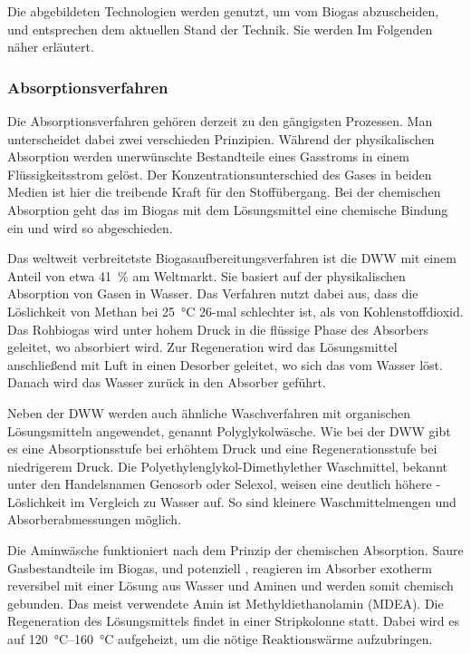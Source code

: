 

Die abgebildeten Technologien werden genutzt, um  vom Biogas abzuscheiden, und entsprechen dem aktuellen Stand der Technik. Sie werden Im Folgenden näher erläutert. 


\subsubsection{Absorptionsverfahren}\label{chap:absorp}

Die Absorptionsverfahren gehören derzeit zu den gängigsten Prozessen. Man unterscheidet dabei zwei verschieden Prinzipien. Während der physikalischen Absorption werden unerwünschte Bestandteile eines Gasstroms in einem Flüssigkeitsstrom gelöst. Der Konzentrationsunterschied des Gases in beiden Medien ist hier die treibende Kraft für den Stoffübergang. Bei der chemischen Absorption geht das  im Biogas mit dem Lösungsmittel eine chemische Bindung ein und wird so abgeschieden. \parencite{Rasi09} \smallskip

Das weltweit verbreitetste Biogasaufbereitungsverfahren ist die \gls{DWW} mit einem Anteil von etwa \SI{41}{\percent} am Weltmarkt. Sie basiert auf der physikalischen Absorption von Gasen in Wasser. Das Verfahren nutzt dabei aus, dass die Löslichkeit von Methan bei \SI{25}{\degreeCelsius} \SI{26}{\relax}-mal schlechter ist, als von Kohlenstoffdioxid. Das Rohbiogas wird unter hohem Druck in die flüssige Phase des Absorbers geleitet, wo  absorbiert wird. Zur Regeneration wird das Lösungsmittel anschließend mit Luft in einen Desorber geleitet, wo sich das  vom Wasser löst. Danach wird das Wasser zurück in den Absorber geführt.  \parencite{KGKK2019} \parencite{BHPT13} \smallskip

Neben der \gls{DWW} werden auch ähnliche Waschverfahren mit organischen Lösungsmitteln angewendet, genannt Polyglykolwäsche. Wie bei der \gls{DWW} gibt es eine Absorptionsstufe bei erhöhtem Druck und eine Regenerationsstufe bei niedrigerem Druck. Die Polyethylenglykol-Dimethylether Waschmittel, bekannt unter den Handelsnamen Genosorb\textsuperscript{\textregistered} oder Selexol\textsuperscript{\textregistered}, weisen eine deutlich höhere -Löslichkeit im Vergleich zu Wasser auf. So sind kleinere Waschmittelmengen und Absorberabmessungen möglich. \parencite{FNR14} \smallskip

Die Aminwäsche funktioniert nach dem Prinzip der chemischen Absorption. Saure Gasbestandteile im Biogas,  und potenziell , reagieren im Absorber exotherm reversibel mit einer Lösung aus Wasser und Aminen und werden somit chemisch gebunden. Das meist verwendete Amin ist Methyldiethanolamin (MDEA). Die Regeneration des Lösungsmittels findet in einer Stripkolonne statt. Dabei wird es auf \SIrange{120}{160}{\degreeCelsius} aufgeheizt, um die nötige Reaktionswärme aufzubringen. \parencite{BHPT13} \parencite{KGKK2019}


